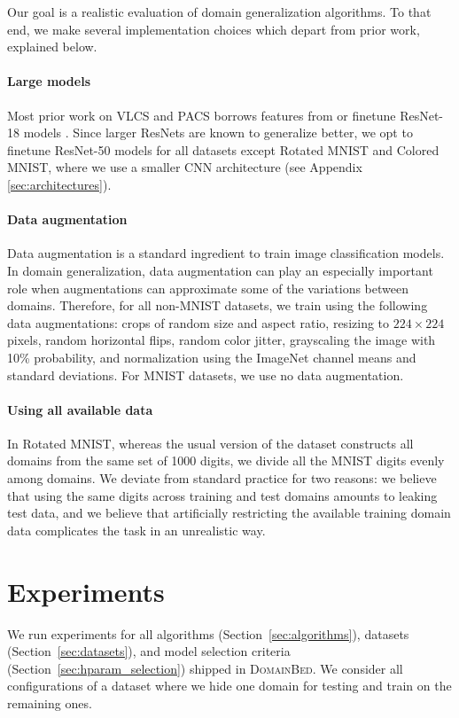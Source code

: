 \documentclass{article}
\newcommand{\domainbed}{\textsc{DomainBed}\xspace}
\begin{document}
Our goal is a realistic evaluation of domain generalization algorithms.
To that end, we make several implementation choices which depart from prior work, explained below.

\paragraph{Large models}
Most prior work on VLCS and PACS borrows features from or finetune ResNet-18 models \citep{He_2016_CVPR}.
Since larger ResNets are known to generalize better, we opt to finetune ResNet-50 models for all datasets except Rotated MNIST and Colored MNIST, where we use a smaller CNN architecture (see Appendix \ref{sec:architectures}).

\paragraph{Data augmentation}
Data augmentation is a standard ingredient to train image classification models.
In domain generalization, data augmentation can play an especially important role when augmentations can approximate some of the variations between domains.
Therefore, for all non-MNIST datasets, we train using the following data augmentations:
crops of random size and aspect ratio, resizing to $224 \times 224$ pixels, random horizontal flips, random color jitter, grayscaling the image with 10\% probability, and normalization using the ImageNet channel means and standard deviations.
For MNIST datasets, we use no data augmentation.

\paragraph{Using all available data}
In Rotated MNIST, whereas the usual version of the dataset constructs all domains from the same set of 1000 digits, we divide all the MNIST digits evenly among domains.
We deviate from standard practice for two reasons: we believe that using the same digits across training and test domains amounts to leaking test data, and we believe that artificially restricting the available training domain data complicates the task in an unrealistic way.

\section{Experiments}
\label{sec:experiments}

We run experiments for all algorithms (Section~\ref{sec:algorithms}), datasets (Section~\ref{sec:datasets}), and model selection criteria (Section~\ref{sec:hparam_selection}) shipped in \domainbed.
We consider all configurations of a dataset where we hide one domain for testing and train on the remaining ones.
\end{document}
